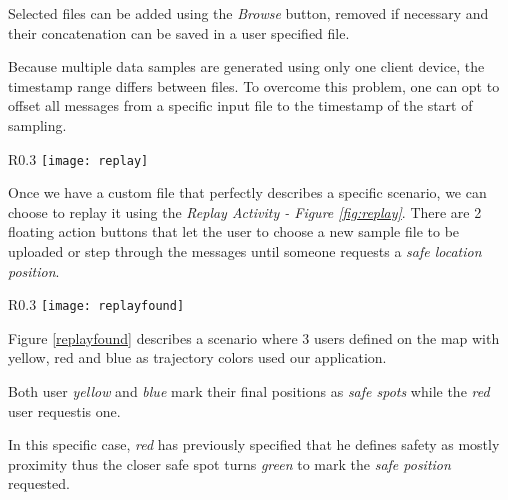 Selected files can be added using the \textit{Browse} button, removed if necessary and their concatenation can be saved in a user specified file.

Because multiple data samples are generated using only one client device, the timestamp range differs between files. To overcome this problem, one can opt to offset all messages from a specific input file to the timestamp of the start of sampling.

\begin{wrapfigure}{R}{0.3\textwidth}
\centering
\texttt{[image: replay]}
\caption{\label{fig:replay}Replay Activity}
\end{wrapfigure}

Once we have a custom file that perfectly describes a specific scenario, we can choose to replay it using the \textit{Replay Activity - Figure \ref{fig:replay}}. There are 2 floating action buttons that let the user to choose a new sample file to be uploaded or step through the messages until someone requests a \textit{safe location position}.

\begin{wrapfigure}{R}{0.3\textwidth}
\centering
\texttt{[image: replayfound]}
\caption{\label{fig:replayfound}Replay Activity with Safe place found}
\end{wrapfigure}

Figure \ref{replayfound} describes a scenario where 3 users defined on the map with yellow, red and blue as trajectory colors used our application.

Both user \textit{yellow} and \textit{blue} mark their final positions as \textit{safe spots} while the \textit{red} user requestis one.

In this specific case, \textit{red} has previously specified that he defines safety as mostly proximity thus the closer safe spot turns \textit{green} to mark the \textit{safe position} requested.

